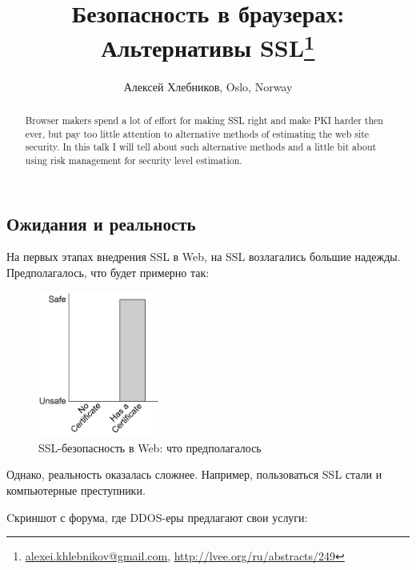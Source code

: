 \documentclass[10pt, a5paper]{article}
\begin{document}
\title{Безопасноcть в браузерах: Альтернативы SSL\footnote{\url{alexei.khlebnikov@gmail.com}, \url{http://lvee.org/ru/abstracts/249}}}
\author{Алексей Хлебников, Oslo, Norway}
\maketitle
\begin{abstract}
Browser makers spend a lot of effort for making SSL right and make PKI
harder then ever, but pay too little attention to alternative methods
of estimating the web site security. In this talk I will tell about
such alternative methods and a little bit about using risk management
for security level estimation.
\end{abstract}
\subsection*{Ожидания и реальность}

На первых этапах внедрения SSL в Web, на SSL возлагались большие
надежды. Предполагалось, что будет примерно так:

\begin{center}

\begin{figure}[h!]
  \centering
  \includegraphics[width=4cm]{Hlebnikov1.png}
  \caption{SSL-безопасность в Web: что предполагалось}
  \label{Hlebnikov1}
\end{figure}

\end{center}

Однако, реальность оказалась сложнее. Например, пользоваться SSL стали
и компьютерные преступники.

Cкриншот с форума, где DDOS-еры предлагают свои услуги: 
\end{document}
